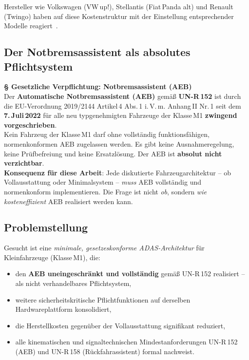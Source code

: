 ﻿\documentclass[a4paper,12pt]{article}
\theoremstyle{definition}
\begin{document}
Hersteller wie Volkswagen (VW\,up!), Stellantis (Fiat\,Panda alt) und
Renault (Twingo) haben auf diese Kostenstruktur mit der Einstellung
entsprechender Modelle reagiert~\cite{autozeitung2023end}.

\subsection{Der Notbremsassistent als absolutes Pflichtsystem}
\label{subsec:aeb_pflicht}

\begin{center}
\colorbox{lightred}{%
\begin{minipage}{0.88\textwidth}
\vspace{4pt}
\textcolor{accentred}{\textbf{\large\S{} Gesetzliche Verpflichtung: Notbremsassistent (AEB)}}\\[4pt]
Der \textbf{Automatische Notbremsassistent (AEB)} gem\"a\ss{} \textbf{UN-R\,152}
ist durch die EU-Verordnung 2019/2144 Artikel\,4 Abs.\,1 i.\,V.\,m.
Anhang\,II Nr.\,1 seit dem \textbf{7.\,Juli\,2022} f\"ur alle neu typgenehmigten
Fahrzeuge der Klasse\,M1 \textbf{zwingend vorgeschrieben}.\\[2pt]
Kein Fahrzeug der Klasse\,M1 darf ohne vollst\"andig funktionsf\"ahigen,
normenkonformen AEB zugelassen werden. Es gibt keine Ausnahmeregelung,
keine Pr\"ufbefreiung und keine Ersatzl\"osung. Der AEB ist
\textbf{absolut nicht verzichtbar}.\\[4pt]
\textbf{Konsequenz f\"ur diese Arbeit}: Jede diskutierte Fahrzeugarchitektur --
ob Vollausstattung oder Minimalsystem -- \emph{muss} AEB vollst\"andig
und normenkonform implementieren. Die Frage ist nicht \emph{ob}, sondern
\emph{wie kosteneffizient} AEB realisiert werden kann.
\vspace{4pt}
\end{minipage}}
\end{center}

\subsection{Problemstellung}

Gesucht ist eine \emph{minimale, gesetzeskonforme ADAS-Architektur} f\"ur
Kleinfahrzeuge (Klasse\,M1), die:

\begin{itemize}
  \item den \textbf{AEB uneingeschr\"ankt und vollst\"andig} gem\"a\ss{}
        UN-R\,152 realisiert -- als nicht verhandelbares Pflichtsystem,
  \item weitere sicherheitskritische Pflichtfunktionen auf derselben
        Hardwareplattform konsolidiert,
  \item die Herstellkosten gegen\"uber der Vollausstattung signifikant reduziert,
  \item alle kinematischen und signaltechnischen Mindestanforderungen
        UN-R\,152 (AEB) und UN-R\,158 (R\"uckfahrassistent) formal nachweist.
\end{itemize}
\end{document}
